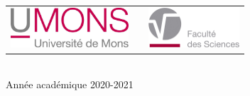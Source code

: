 \documentclass{article}
\begin{document}
\begin{titlepage}
\begin{center}
        \begin{center}
            \begin{tabular}[t]{c c c}
                \includegraphics[height=1.5cm]{images/logoumons.jpg} &
                \hspace{0.3cm} &
                \includegraphics[height=1.5cm]{images/logofs.jpg}
            \end{tabular}
        \end{center}~\\
        
        {\large Année académique 2020-2021}
        
    \end{center}
\end{titlepage}

\tableofcontents
\end{document}
